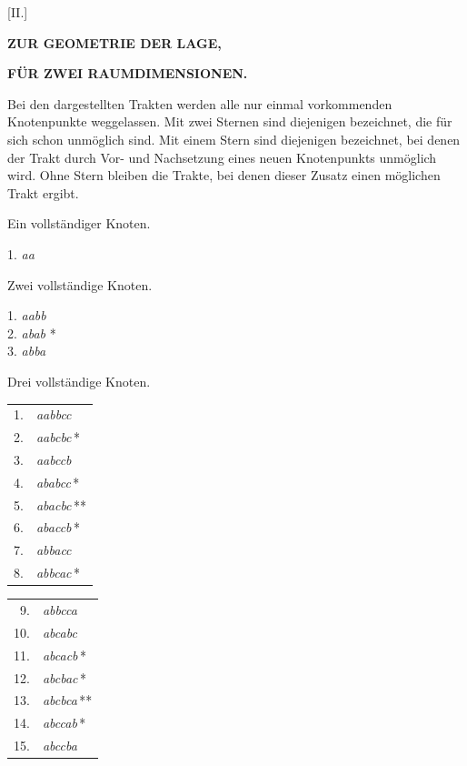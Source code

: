 \clearpage{}
\begin{center}
[II.]
\end{center}

\begin{center}\textbf{ZUR GEOMETRIE DER LAGE,}\par\medskip\textbf{FÜR ZWEI RAUMDIMENSIONEN.}\end{center}

Bei den dargestellten Trakten werden alle nur einmal vorkommenden Knotenpunkte weggelassen. Mit zwei Sternen sind diejenigen bezeichnet, die für sich schon unmöglich sind. Mit einem Stern sind diejenigen bezeichnet, bei denen der Trakt durch Vor- und Nachsetzung eines neuen Knotenpunkts unmöglich wird. Ohne Stern bleiben die Trakte, bei denen dieser Zusatz einen möglichen Trakt ergibt.

\begin{center}
Ein vollständiger Knoten.

1. \emph{aa}
\end{center}

\begin{center}
Zwei vollständige Knoten.

1. \emph{aabb}\\
2. \emph{abab} *\\
3. \emph{abba}
\end{center}

\begin{center}
Drei vollständige Knoten.
\end{center}
\begin{center}
\begin{minipage}[t]{.30\linewidth}\centering\begin{tabular}[t]{rl}
1. & \emph{aabbcc} \\
2. & \emph{aabcbc}\,* \\
3. & \emph{aabccb} \\
4. & \emph{ababcc}\,* \\
5. & \emph{abacbc}\,** \\
6. & \emph{abaccb}\,* \\
7. & \emph{abbacc} \\
8. & \emph{abbcac}\,* \\
\end{tabular}\end{minipage}\hspace{1em}\begin{minipage}[t]{.30\linewidth}\centering\begin{tabular}[t]{rl}
9. & \emph{abbcca} \\
10. & \emph{abcabc} \\
11. & \emph{abcacb}\,* \\
12. & \emph{abcbac}\,* \\
13. & \emph{abcbca}\,** \\
14. & \emph{abccab}\,* \\
15. & \emph{abccba} \\
\end{tabular}\end{minipage}
\end{center}
